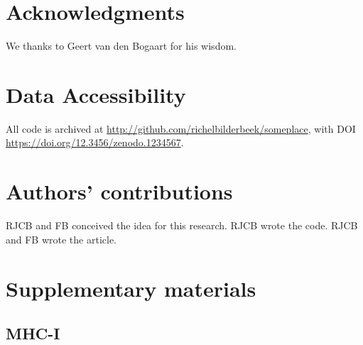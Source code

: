 \documentclass{article}
\newcommand{\richel}[1]{\textcolor{orange}{\textbf{[RB: #1]}}}
\begin{document}
\section{Acknowledgments}

We thanks to Geert van den Bogaart for his wisdom.

\section{Data Accessibility}

All code is archived at \url{http://github.com/richelbilderbeek/someplace},
with DOI \url{https://doi.org/12.3456/zenodo.1234567}.

\section{Authors' contributions}

RJCB and FB conceived the idea for this research. 
RJCB wrote the code.
RJCB and FB wrote the article.





\appendix
\section{Supplementary materials}

\subsection{MHC-I}

\begin{table}
  
  \caption{
    Percentage of MHC-I epitopes overlapping with transmembrane helix.
    \richel{This is simulated data}
  }
  \label{table:1}
\end{table}

\begin{table}
  
  \caption{
    Kolmogorov-Smirnov test results
    \richel{Done on the simulated data}
  }
  \label{table:ks}
\end{table}
\end{document}
